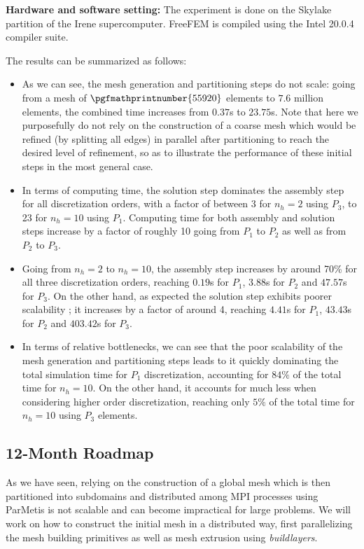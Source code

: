 \textbf{Hardware and software setting:} The experiment is done on the Skylake partition of the Irene supercomputer. FreeFEM is compiled using the Intel 20.0.4 compiler suite.

The results can be summarized as follows:

\begin{itemize}
\item As we can see, the mesh generation and partitioning steps do not scale: going from a mesh of $\pgfmathprintnumber{55920}$ elements to $7.6$ million elements, the combined time increases from $0.37$s to $23.75$s. Note that here we purposefully do not rely on the construction of a coarse mesh which would be refined (by splitting all edges) in parallel after partitioning to reach the desired level of refinement, so as to illustrate the performance of these initial steps in the most general case.
\item In terms of computing time, the solution step dominates the assembly step for all discretization orders, with a factor of between 3 for $n_h = 2$ using $P_3$, to 23 for $n_h = 10$ using $P_1$. Computing time for both assembly and solution steps increase by a factor of roughly 10 going from $P_1$ to $P_2$ as well as from $P_2$ to $P_3$.
\item Going from $n_h = 2$ to $n_h = 10$, the assembly step increases by around 70\% for all three discretization orders, reaching $0.19$s for $P_1$, $3.88$s for $P_2$ and $47.57$s for $P_3$. On the other hand, as expected the solution step exhibits poorer scalability ; it increases by a factor of around 4, reaching $4.41$s for $P_1$, $43.43$s for $P_2$ and $403.42$s for $P_3$.
\item In terms of relative bottlenecks, we can see that the poor scalability of the mesh generation and partitioning steps leads to it quickly dominating the total simulation time for $P_1$ discretization, accounting for $84\%$ of the total time for $n_h = 10$. On the other hand, it accounts for much less when considering higher order discretization, reaching only $5\%$ of the total time for $n_h = 10$ using $P_3$ elements.
\end{itemize}

\subsection{12-Month Roadmap}
\label{sec:WP1:Freefem++:roadmap}

As we have seen, relying on the construction of a global mesh which is then partitioned into subdomains and distributed among MPI processes using ParMetis is not scalable and can become impractical for large problems. We will work on how to construct the initial mesh in a distributed way, first parallelizing the mesh building primitives as well as mesh extrusion using \textit{buildlayers}.

